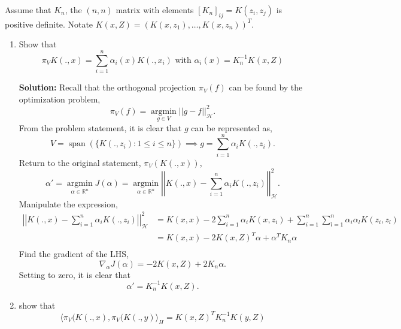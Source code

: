 \documentclass{article}[12pt]
\begin{document}
Assume that $K_n$, the $(n,n)$ matrix with elements $[K_n]_{ij}=K(z_i,z_j)$ is positive definite. Notate $K(x,Z)=(K(x,z_1),\ldots,K(x,z_n))^T$. 
\begin{enumerate}
\item Show that 
\begin{equation}
\pi_V K(.,x) = \sum_{i=1}^n \alpha_i(x)K(.,x_i) \mbox{ with } \alpha_i(x)=K_n^{-1}K(x,Z)
\end{equation}

\textbf{Solution:} Recall that the orthogonal projection $\pi_V(f)$ can be found by the optimization problem,
\begin{equation}
	\pi_V(f) = \operatorname*{argmin}_{g \in V} || g - f ||_{\mathcal H}^2.
\end{equation}
From the problem statement, it is clear that $g$ can be represented as,
\begin{equation}
	V = \operatorname{span}(\{K(.,z_i): 1 \le i \le n\}) \implies g = \sum^{n}_{i=1} \alpha_i K(., z_i). 
\end{equation}
Return to the original statement, $\pi_V(K(.,x))$,
\begin{equation}
	\alpha' = \operatorname*{argmin}_{\alpha \in \mathbb R^n} J(\alpha) = \operatorname*{argmin}_{\alpha \in \mathbb R^n} \left|\left|K(., x) - \sum^{n}_{i=1} \alpha_i K(., z_i) \right|\right|_{\mathcal H}^2.
\end{equation}
Manipulate the expression,
\begin{equation}
	\begin{aligned}
		\left|\left|K(., x) - \sum^{n}_{i=1} \alpha_i K(., z_i) \right|\right|_{\mathcal H}^2 &= K(x,x) - 2 \sum^{n}_{i=1} \alpha_i K(x, z_i) + \sum^{n}_{i=1} \sum^{n}_{l=1} \alpha_i \alpha_l K(z_i, z_l)\\
												      &= K(x,x) - 2 K(x, Z)^T \alpha + \alpha^T K_n \alpha \\ 
	\end{aligned}
\end{equation}
Find the gradient of the LHS,
\begin{equation}
	\nabla_\alpha J(\alpha) = -2 K(x, Z) + 2 K_n \alpha. 
\end{equation}
Setting to zero, it is clear that 
\begin{equation} \label{eq:alpha_opt}
	\alpha' = K_n^{-1} K(x, Z).
\end{equation}

\item show that 
\begin{equation}
 \langle \pi_V(K(.,x),\pi_V(K(.,y) \rangle_H = K(x,Z)^T K_n^{-1} K(y,Z)
 \end{equation}
 

\end{enumerate}
\end{document}
